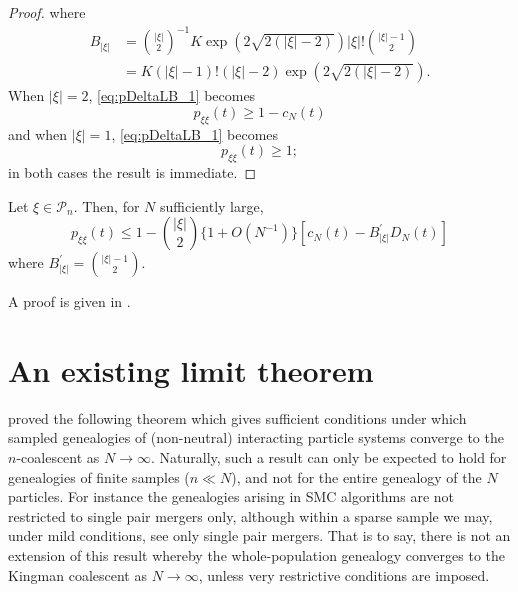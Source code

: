 \begin{proof}
where
\begin{align*}
B_{|\xi|} 
&= \binom{|\xi|}{2}^{-1} K \exp( 2 \sqrt{2(|\xi|-2)} ) |\xi|! \binom{ |\xi|-1}{2} \\
&= K (|\xi|-1)! (|\xi|-2) \exp( 2 \sqrt{2(|\xi|-2)} ) .
\end{align*}
When $|\xi| = 2$, \eqref{eq:pDeltaLB_1} becomes 
\begin{equation*}
p_{ \xi \xi }( t )
\geq 1 - c_N(t)
\end{equation*}
and when $|\xi| = 1$, 
\eqref{eq:pDeltaLB_1} becomes 
\begin{equation*}
p_{ \xi \xi }( t )
\geq 1 ;
\end{equation*}
in both cases the result is immediate.
\end{proof}


\begin{prop}%
\label{thm:pDelta_UB}
Let $\xi \in \mathcal{P}_n$. Then, for $N$ sufficiently large,
\begin{equation*}
p_{\xi\xi}(t)
\leq 1 - \binom{|\xi|}{2} \{ 1 + O(N^{-1}) \} 
        \left[ c_N(t) - B_{|\xi|}^\prime D_N(t) \right]
\end{equation*}
where $B_{|\xi|}^\prime = \binom{|\xi|-1}{2}$.
\end{prop}

A proof is given in \textcite[Lemma 1 Case 1]{koskela2018}.





\section{An existing limit theorem}
\textcite{koskela2018} proved the following theorem which gives sufficient conditions under which sampled genealogies of (non-neutral) interacting particle systems converge to the $n$-coalescent as $N\to\infty$.
Naturally, such a result can only be expected to hold for genealogies of finite samples ($n\ll N$), and not for the entire genealogy of the $N$ particles. 
For instance the genealogies arising in SMC algorithms are not restricted to single pair mergers only, although within a sparse sample we may, under mild conditions, see only single pair mergers. 
That is to say, there is not an extension of this result whereby the whole-population genealogy converges to the Kingman coalescent as $N\to\infty$, unless very restrictive conditions are imposed.

